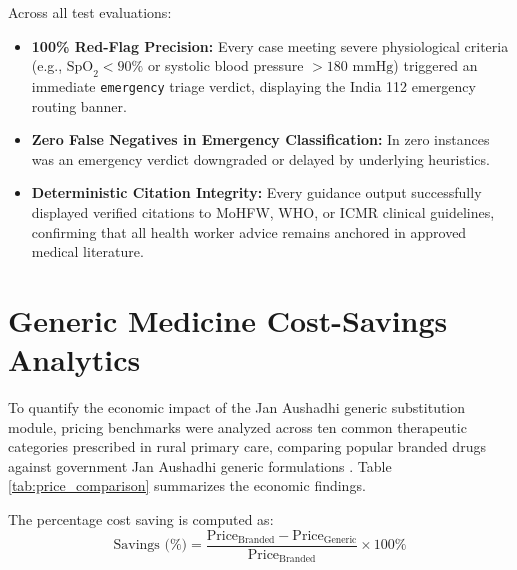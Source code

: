 \documentclass[12pt,a4paper,oneside]{report}
\begin{document}
Across all test evaluations:
\begin{itemize}[leftmargin=1.5em,itemsep=1pt,topsep=1pt,parsep=0pt]
    \item \textbf{100\% Red-Flag Precision:} Every case meeting severe physiological criteria (e.g., $\text{SpO}_2 < 90\%$ or systolic blood pressure $>180\text{ mmHg}$) triggered an immediate \texttt{emergency} triage verdict, displaying the India 112 emergency routing banner.
    \item \textbf{Zero False Negatives in Emergency Classification:} In zero instances was an emergency verdict downgraded or delayed by underlying heuristics.
    \item \textbf{Deterministic Citation Integrity:} Every guidance output successfully displayed verified citations to MoHFW, WHO, or ICMR clinical guidelines, confirming that all health worker advice remains anchored in approved medical literature.
\end{itemize}

\section{Generic Medicine Cost-Savings Analytics}
To quantify the economic impact of the Jan Aushadhi generic substitution module, pricing benchmarks were analyzed across ten common therapeutic categories prescribed in rural primary care, comparing popular branded drugs against government Jan Aushadhi generic formulations \cite{pmbjp2024}. Table \ref{tab:price_comparison} summarizes the economic findings.

The percentage cost saving is computed as:
\begin{equation}
    \text{Savings (\%)} = \frac{\text{Price}_{\text{Branded}} - \text{Price}_{\text{Generic}}}{\text{Price}_{\text{Branded}}} \times 100\%
    \label{eq:savings}
\end{equation}
\end{document}
